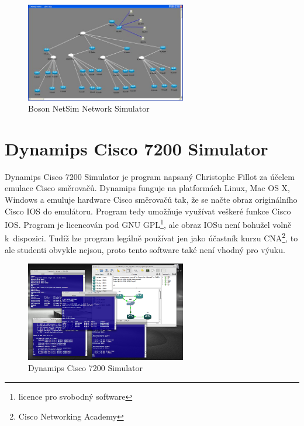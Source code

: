 \begin{figure}[h]
\begin{center}
\includegraphics[width=7cm]{figures/r_boson}
\caption{Boson NetSim Network Simulator}
\label{fig:r_boson}
\end{center}
\end{figure}

\section{Dynamips Cisco 7200 Simulator}
Dynamips Cisco 7200 Simulator \cite{reserse:dynamips} je program napsaný Christophe Fillot za účelem emulace Cisco směrovačů. Dynamips funguje na platformách Linux, Mac OS X, Windows a emuluje hardware Cisco směrovačů tak, že se načte obraz originálního Cisco IOS do emulátoru. Program tedy umožňuje využívat veškeré funkce Cisco IOS. Program je licencován pod GNU GPL\footnote{licence pro svobodný software}, ale obraz IOSu není bohužel volně k~dispozici. Tudíž lze program legálně používat jen jako účastník kurzu CNA\footnote{Cisco Networking Academy}, to ale studenti obvykle nejsou, proto tento software také není vhodný pro výuku.

\begin{figure}[h]
\begin{center}
\includegraphics[width=7cm]{figures/r_dynamips}
\caption{Dynamips Cisco 7200 Simulator}
\label{fig:r_dynamips}
\end{center}
\end{figure}

\newpage

